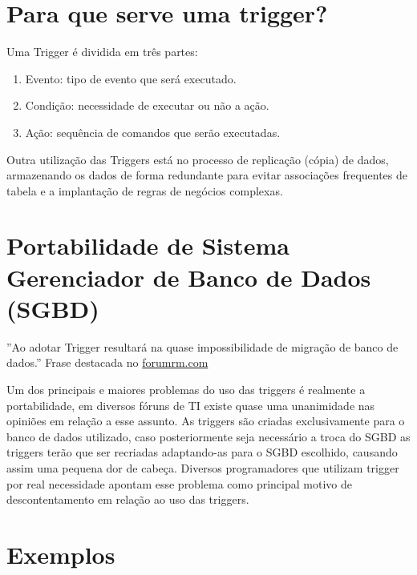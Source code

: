 \documentclass[12pt,a4paper]{article}
\begin{document}
\section{Para que serve uma trigger?}
Uma Trigger é dividida em três partes:

\begin{enumerate}


\item Evento: tipo de evento que será executado.
\item Condição: necessidade de executar ou não a ação.
\item Ação: sequência de comandos que serão executadas.
\end{enumerate}

Outra utilização das Triggers está no processo de replicação (cópia) de dados, armazenando os dados de forma redundante para evitar associações frequentes de tabela e a implantação de regras de negócios complexas.

\section{Portabilidade de Sistema Gerenciador de Banco de Dados (SGBD)}
”Ao adotar Trigger resultará na quase impossibilidade de migração de banco de dados.” 
Frase destacada no \url{forumrm.com}
 
Um dos principais e maiores problemas do uso das triggers é realmente a portabilidade, em diversos fóruns de TI existe quase uma unanimidade nas opiniões em relação a esse assunto.
As triggers são criadas exclusivamente para o banco de dados utilizado, caso posteriormente seja necessário a troca do SGBD as triggers terão que ser recriadas adaptando-as para o  SGBD escolhido, causando assim uma pequena dor de cabeça.
Diversos programadores que utilizam trigger por real necessidade apontam esse problema como principal motivo de descontentamento em relação ao uso das triggers. 

\section{Exemplos}
\end{document}
